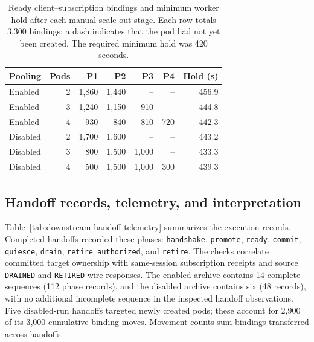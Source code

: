 \documentclass[10pt,a4paper]{article}
\begin{document}
\begin{table}[htbp]
\centering
\footnotesize
\setlength{\tabcolsep}{3pt}
\caption{Ready client--subscription bindings and minimum worker hold after each manual scale-out stage. Each row totals 3,300 bindings; a dash indicates that the pod had not yet been created. The required minimum hold was 420 seconds.}
\label{tab:downstream-binding-distribution}
\begin{tabular}{@{}lrrrrrr@{}}
\toprule
Pooling & Pods & P1 & P2 & P3 & P4 & Hold (s) \\
\midrule
Enabled & 2 & 1,860 & 1,440 & -- & -- & 456.9 \\
Enabled & 3 & 1,240 & 1,150 & 910 & -- & 444.8 \\
Enabled & 4 & 930 & 840 & 810 & 720 & 442.3 \\
\addlinespace
Disabled & 2 & 1,700 & 1,600 & -- & -- & 443.2 \\
Disabled & 3 & 800 & 1,500 & 1,000 & -- & 433.3 \\
Disabled & 4 & 500 & 1,500 & 1,000 & 300 & 439.3 \\
\bottomrule
\end{tabular}
\end{table}

\subsection{Handoff records, telemetry, and interpretation}
Table~\ref{tab:downstream-handoff-telemetry} summarizes the execution records. Completed handoffs recorded these phases: \texttt{handshake}, \texttt{promote}, \texttt{ready}, \texttt{commit}, \texttt{quiesce}, \texttt{drain}, \texttt{retire\_\allowbreak{}authorized}, and \texttt{retire}. The checks correlate committed target ownership with same-session subscription receipts and source \texttt{DRAINED} and \texttt{RETIRED} wire responses. The enabled archive contains 14 complete sequences (112 phase records), and the disabled archive contains six (48 records), with no additional incomplete sequence in the inspected handoff observations. Five disabled-run handoffs targeted newly created pods; these account for 2,900 of its 3,000 cumulative binding moves. Movement counts sum bindings transferred across handoffs.
\end{document}
